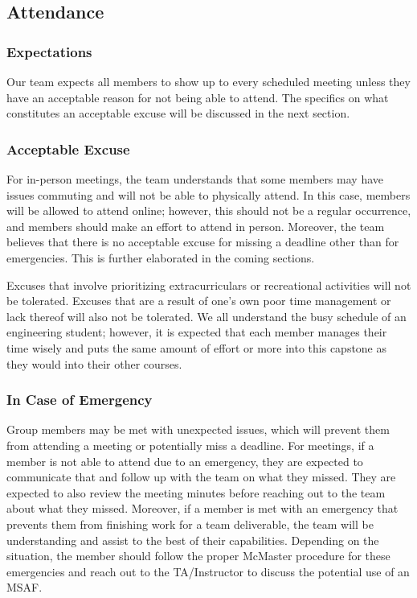 \documentclass{article}
\begin{document}
\subsection*{Attendance}

\subsubsection*{Expectations}

Our team expects all members to show up to every scheduled meeting unless they
 have an acceptable reason for not being able to attend. The specifics on what 
 constitutes an acceptable excuse will be discussed in the next section.

\subsubsection*{Acceptable Excuse}

For in-person meetings, the team understands that some members may have issues
 commuting and will not be able to physically attend. In this case, members 
 will be allowed to attend online; however, this should not be a regular 
 occurrence, and members should make an effort to attend in person. 
 Moreover, the team believes that there is no acceptable excuse for missing
 a deadline other than for emergencies. 
 This is further elaborated in the coming sections. 

Excuses that involve prioritizing extracurriculars or recreational activities will not be tolerated.
Excuses that are a result of one's own poor time management or lack thereof will also not be tolerated.
We all understand the busy schedule of an engineering student; however, it is expected that each member 
manages their time wisely and puts the same amount of effort or 
more into this capstone as they would into their other courses.



\subsubsection*{In Case of Emergency}

Group members may be met with unexpected issues, which will prevent them 
from attending a meeting or potentially miss a deadline. For meetings, 
if a member is not able to attend due to an emergency, they are expected 
to communicate that and follow up with the team on what they missed. 
They are expected to also review the meeting minutes before reaching 
out to the team about what they missed. Moreover, if a member is met 
with an emergency that prevents them from finishing work for a team 
deliverable, the team will be understanding and assist to the best 
of their capabilities. Depending on the situation, the member should 
follow the proper McMaster procedure for these emergencies and reach 
out to the TA/Instructor to discuss the potential use of an MSAF.
\end{document}
